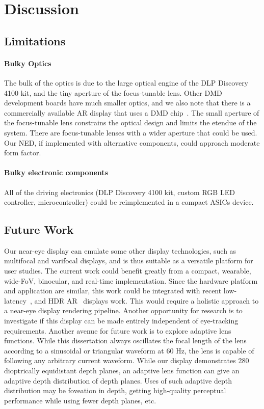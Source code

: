 \section{Discussion}
\label{sec:volumetric:discussion}

\subsection{Limitations}
\paragraph{Bulky Optics}
The bulk of the optics is due to the large optical engine of the DLP Discovery 4100 kit, and the tiny aperture of the focus-tunable lens. Other DMD development boards have much smaller optics, and we also note that there is a commercially available AR display that uses a DMD chip~\cite{Dewald2016Avegant}. The small aperture of the focus-tunable lens constrains the optical design and limits the etendue of the system. There are focus-tunable lenses with a wider aperture that could be used. Our NED, if implemented with alternative components, could approach moderate form factor.

\paragraph{Bulky electronic components}
All of the driving electronics (DLP Discovery 4100 kit, custom RGB LED controller, microcontroller) could be reimplemented in a compact ASICs device. 

\subsection{Future Work}
Our near-eye display can emulate some other display technologies, such as multifocal and varifocal displays, and is thus suitable as a versatile platform for user studies. 
The current work could benefit greatly from a compact, wearable, wide-FoV, binocular, and real-time implementation. 
Since the hardware platform and application are similar, this work could be integrated with recent low-latency~\cite{Lincoln2016motion}, and HDR AR~\cite{Lincoln2017scene} displays work. 
This would require a holistic approach to a near-eye display rendering pipeline. 
Another opportunity for research is to investigate if this display can be made entirely independent of eye-tracking requirements. 
Another avenue for future work is to explore adaptive lens functions. 
While this dissertation always oscillates the focal length of the lens according to a sinusoidal or triangular waveform at 60 Hz, the lens is capable of following any arbitrary current waveform. 
While our display demonstrates 280 dioptrically equidistant depth planes, an adaptive lens function can give an adaptive depth distribution of depth planes. 
Uses of such adaptive depth distribution may be foveation in depth, getting high-quality perceptual performance while using fewer depth planes, etc. 

